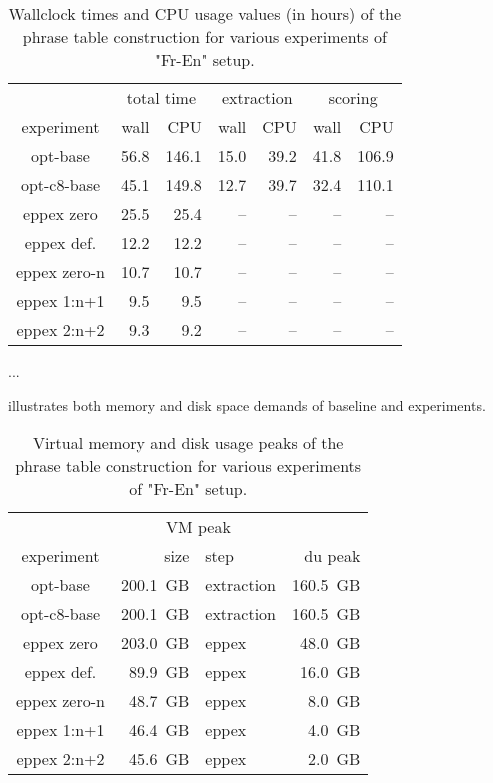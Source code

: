 \begin{table}[ht]
\centering
\begin{tabular}{ | c | r r | r r | r r | }
\hline
 & \multicolumn{2}{|c|}{total time} & \multicolumn{2}{|c|}{extraction} & \multicolumn{2}{|c|}{scoring} \\
experiment & wall & CPU & wall & CPU & wall & CPU \\
\hline
\hline
opt-base      & 56.8 & 146.1 & 15.0 & 39.2 & 41.8 & 106.9 \\
opt-c8-base   & 45.1 & 149.8 & 12.7 & 39.7 & 32.4 & 110.1 \\
eppex zero    & 25.5 &  25.4 & -- & -- & -- & -- \\
\hline
eppex def.    & 12.2 & 12.2 & -- & -- & -- & -- \\
eppex zero-n  & 10.7 & 10.7 & -- & -- & -- & -- \\
eppex 1:n+1   & 9.5 & 9.5 & -- & -- & -- & -- \\
eppex 2:n+2   & 9.3 & 9.2 & -- & -- & -- & -- \\
\hline
\end{tabular}
\caption{\label{fr-en-time-benchmarks}
Wallclock times and CPU usage values (in hours) of the phrase table
construction for various experiments of "Fr-En" setup.}
\end{table}

...

 illustrates both memory and disk space demands of baseline
and \eppex{} experiments.

\begin{table}[ht]
\centering
\begin{tabular}{ | c | r l | r | }
\hline
 & \multicolumn{2}{|c|}{VM peak} & \\
experiment & size & step & du peak \\
\hline
\hline
opt-base       & 200.1~GB & extraction & 160.5~GB \\
opt-c8-base    & 200.1~GB & extraction & 160.5~GB \\
eppex zero     & 203.0~GB &      eppex &  48.0~GB \\
\hline
eppex def.     &  89.9~GB &      eppex &  16.0~GB \\
eppex zero-n   &  48.7~GB &      eppex &   8.0~GB \\
eppex 1:n+1    &  46.4~GB &      eppex &   4.0~GB \\
eppex 2:n+2    &  45.6~GB &      eppex &   2.0~GB \\
\hline
\end{tabular}
\caption{\label{fr-en-vm-and-disk-usage-peaks}
Virtual memory and disk usage peaks of the phrase table construction for various experiments of "Fr-En" setup.}
\end{table}

